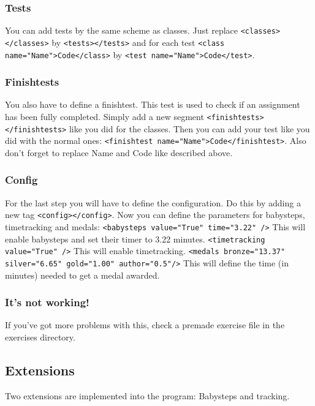 \documentclass[10pt,a4paper]{article}
\begin{document}
\subsubsection{Tests}
You can add tests by the same scheme as classes. Just replace \texttt{<classes></classes>} by \texttt{<tests></tests>} and for each test \texttt{<class name="Name">Code</class>} by \texttt{<test name="Name">Code</test>}.
\subsubsection{Finishtests}
You also have to define a finishtest. This test is used to check if an assignment has been fully completed. Simply add a new segment \texttt{<finishtests></finishtests>} like you did for the classes. Then you can add your test like you did with the normal ones: \texttt{<finishtest name="Name">Code</finishtest>}. Also don't forget to replace Name and Code like described above.
\subsubsection{Config}
For the last step you will have to define the configuration. Do this by adding a new tag  \texttt{<config></config>}. \newline
Now you can define the parameters for babysteps, timetracking and medals: \newline\newline
\texttt{<babysteps value="True" time="3.22" />} This will enable babysteps and set their timer to 3.22 minutes. \newline\newline
\texttt{<timetracking value="True" />} This will enable timetracking. \newline\newline
\texttt{<medals bronze="13.37" silver="6.65" gold="1.00" author="0.5"/>} This will define the time (in minutes) needed to get a medal awarded. 

\subsubsection{It's not working!}
If you've got more problems with this, check a premade exercise file in the exercises directory.

\subsection{Extensions}
Two extensions are implemented into the program: Babysteps and tracking.
\end{document}
